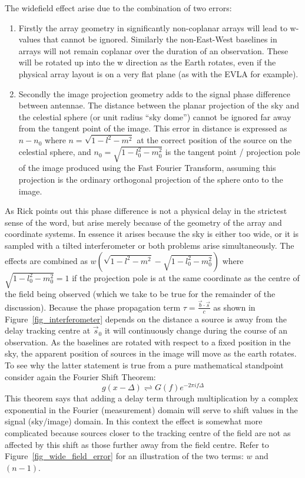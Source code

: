 The widefield effect arise due to the combination of two errors:
\begin{enumerate}
 \item Firstly the array geometry in significantly non-coplanar arrays will lead to w-values that cannot be ignored. Similarly the non-East-West baselines
 in arrays will not remain coplanar over the duration of an observation. These will be rotated up into the w direction as the Earth rotates, even if the physical 
 array layout is on a very flat plane (as with the EVLA for example).
 \item Secondly the image projection geometry adds to the signal phase difference between antennae. The distance between the planar projection of the sky and the 
 celestial sphere (or unit radius ``sky dome'') cannot be ignored far away from the tangent point of the image. This error in distance is expressed 
 as $n-n_0$ where $n = \sqrt{1-l^2-m^2}$ at the correct position of the source on the celestial sphere, and $n_0=\sqrt{1-l_0^2-m_0^2}$ is the 
 tangent point / projection pole of the image produced using the Fast Fourier Transform, assuming this projection is the ordinary orthogonal 
 projection of the sphere onto to the image.
\end{enumerate}
As Rick points out this phase difference is not a physical delay in the strictest sense of the word, but arise merely because of the geometry of the array and coordinate
systems. In essence it arises because the sky is either too wide, or it is sampled with a tilted interferometer or both problems arise simultaneously. The effects 
are combined as $w(\sqrt{1-l^2-m^2} - \sqrt{1-l_0^2-m_0^2})$ where $\sqrt{1-l_0^2-m_0^2} = 1$ if the projection pole is at the same coordinate as the centre
of the field being observed (which we take to be true for the remainder of the discussion). Because the phase propagation term $\tau = \frac{\vec{b}\cdot\vec{s}}{c}$ as 
shown in Figure~\ref{fig_interferometer} depends on the distance a source is away from the delay tracking centre at $\vec{s}_0$ it will continuously change during the course 
of an observation. As the baselines are rotated with respect to a fixed position in the sky, the apparent position of sources in the image will move as the earth rotates. To see why 
the latter statement is true from a pure mathematical standpoint consider again the Fourier Shift Theorem:
\begin{equation}
 g(x-\Delta) \rightleftharpoons G(f)e^{-2\pi if\Delta}
\end{equation}
This theorem says that adding a delay term through multiplication by a complex exponential in the Fourier (measurement) domain will serve to shift values in the 
signal (sky/image) domain. In this context the effect is somewhat more complicated because sources closer to the tracking centre of the field are not as affected 
by this shift as those further away from the field centre. Refer to Figure~\ref{fig_wide_field_error} for an illustration of the two terms: $w$ and $(n-1)$.

